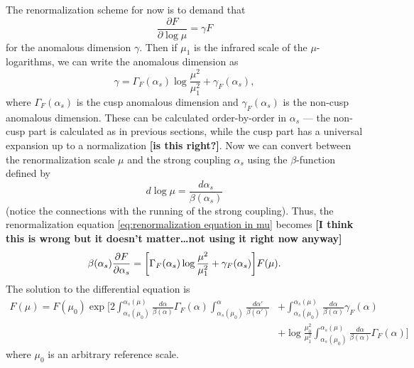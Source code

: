 \documentclass[11pt,twoside,reqno]{amsart}
\theoremstyle{plain}
\theoremstyle{remark}
\theoremstyle{definition}
\theoremstyle{remark}
\theoremstyle{definition}
\theoremstyle{definition}
\begin{document}
	The renormalization scheme for now is to demand that
	\begin{equation}\label{eq:renormalization equation in mu}
		\frac{\partial F}{\partial \log\mu} = \gamma F
	\end{equation}
	for the anomalous dimension $\gamma$. Then if $\mu_1$ is the infrared scale of the $\mu$-logarithms, we can write the anomalous dimension as \cite{frye_factorization_2016}
	\begin{equation}
		\gamma = \Gamma_{F}(\alpha_s)\log\frac{\mu^2}{\mu_1^2} + \gamma_F(\alpha_s),
	\end{equation}
	where $\Gamma_F(\alpha_s)$ is the cusp anomalous dimension and $\gamma_F(\alpha_s)$ is the non-cusp anomalous dimension. These can be calculated order-by-order in $\alpha_s$ --- the non-cusp part is calculated as in previous sections, while the cusp part has a universal expansion up to a normalization \cite{frye_factorization_2016} {\color{red}\textbf{[is this right?]}}. Now we can convert between the renormalization scale $\mu$ and the strong coupling $\alpha_s$ using the $\beta$-function defined by
	\begin{equation}
		d\log\mu = \frac{d\alpha_s}{\beta(\alpha_s)}
	\end{equation}
	(notice the connections with the running of the strong coupling). Thus, the renormalization equation \ref{eq:renormalization equation in mu} becomes {\color{red}\textbf{[I think this is wrong but it doesn't matter\dots not using it right now anyway]}}
	\begin{equation}
		\beta(\alpha_s)\frac{\partial F}{\partial \alpha_s} = \qty[\Gamma_{F}(\alpha_s)\log\frac{\mu^2}{\mu_1^2} + \gamma_F(\alpha_s)]F(\mu).
	\end{equation}
	The solution to the differential equation is \cite{frye_factorization_2016}
	\begin{equation}\label{eq:renormalization solution}
	\begin{aligned}
		F(\mu) = F(\mu_0) \exp\Bigg[ 2\int_{\alpha_s(\mu_0)}^{\alpha_s(\mu)} \frac{d\alpha}{\beta(\alpha)}\Gamma_F(\alpha)\int_{\alpha_s(\mu_0)}^\alpha \frac{d\alpha'}{\beta(\alpha')} &+ \int_{\alpha_s(\mu_0)}^{\alpha_s(\mu)} \frac{d\alpha}{\beta(\alpha)}\gamma_F(\alpha) \\ 
			&+ \log\frac{\mu_0^2}{\mu_1^2}\int_{\alpha_s(\mu_0)}^{\alpha_s(\mu)} \frac{d\alpha}{\beta(\alpha)}\Gamma_F(\alpha) \Bigg]
	\end{aligned}
	\end{equation}
	where $\mu_0$ is an arbitrary reference scale.
\end{document}
